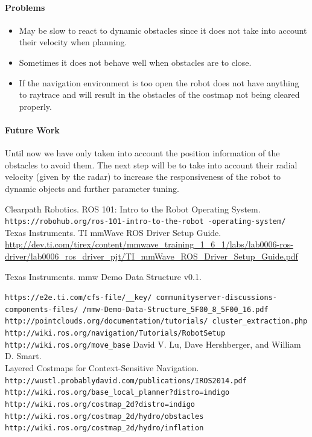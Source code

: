 \documentclass[12pt]{article}
\begin{document}
\paragraph{Problems}
\begin{itemize}
    \item May be slow to react to dynamic obstacles since it does not take into account their velocity when planning.
    \item Sometimes it does not behave well when obstacles are to close.
    \item If the navigation environment is too open the robot does not have anything to raytrace and will result in the obstacles of the costmap not being cleared properly.
\end{itemize}
\paragraph{Future Work}
Until now we have only taken into account the position information of the obstacles to avoid them. The next step will be to take into account their radial velocity (given by the radar) to increase the responsiveness of the robot to dynamic objects and further parameter tuning.  
\begin{thebibliography}{9}
Clearpath Robotics. ROS 101: Intro to the Robot Operating System.\\
\texttt{https://robohub.org/ros-101-intro-to-the-robot \linebreak -operating-system/}
Texas Instruments. TI mmWave ROS Driver Setup Guide. \\
\url{http://dev.ti.com/tirex/content/mmwave\_training\_1\_6\_1/labs/lab0006-ros-driver/lab0006\_ros\_driver\_pjt/TI\_mmWave\_ROS\_Driver\_Setup\_Guide.pdf}

Texas Instruments. mmw Demo Data Structure v0.1. 

\texttt{https://e2e.ti.com/cfs-file/\_\_key/ \linebreak communityserver-discussions-components-files/ /mmw-Demo-Data-Structure\_5F00\_8\_5F00\_16.pdf}
\texttt{http://pointclouds.org/documentation/tutorials/ \linebreak cluster\_extraction.php}
\texttt{http://wiki.ros.org/navigation/Tutorials/RobotSetup}
\texttt{http://wiki.ros.org/move\_base}
David V. Lu, Dave Hershberger, and William D. Smart.\\
Layered Costmaps for Context-Sensitive Navigation.\\
\texttt{http://wustl.probablydavid.com/publications/IROS2014.pdf}
\texttt{http://wiki.ros.org/base\_local\_planner?distro=indigo}
\texttt{http://wiki.ros.org/costmap\_2d?distro=indigo}
\texttt{http://wiki.ros.org/costmap\_2d/hydro/obstacles}
\texttt{http://wiki.ros.org/costmap\_2d/hydro/inflation}

\end{thebibliography}
\end{document}
